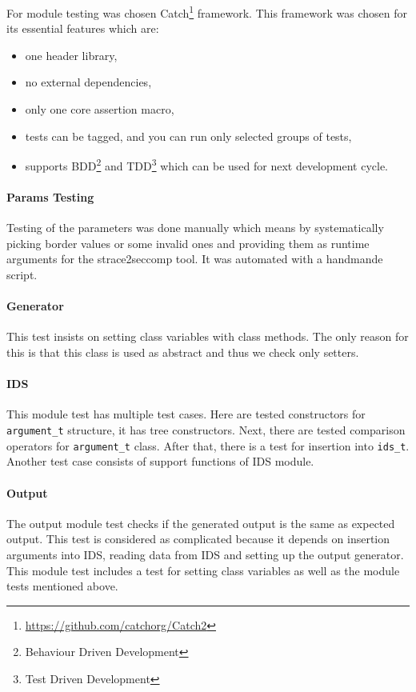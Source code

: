 For module testing was chosen Catch\footnote{\url{https://github.com/catchorg/Catch2}}
framework. This framework was chosen for its essential features which are:
\begin{itemize}
	\item one header library,
	\item no external dependencies,
	\item only one core assertion macro,
	\item tests can be tagged, and you can run only selected groups of tests,
	\item supports BDD\footnote{Behaviour Driven Development} and
	TDD\footnote{Test Driven Development} which can be used for next development
	cycle.
\end{itemize}

\paragraph{Params Testing}
Testing of the parameters was done manually which means by systematically
picking border values or some invalid ones and providing them as runtime
arguments for the strace2seccomp tool. It was automated with a handmande script.

\paragraph{Generator}
This test insists on setting class variables with class methods. The only reason
for this is that this class is used as abstract and thus we check only setters.

\paragraph{IDS}
This module test has multiple test cases. Here are tested constructors for
\texttt{argument\_t} structure, it has tree constructors. Next, there are tested
comparison operators for \texttt{argument\_t} class. After that, there is a test
for insertion into \texttt{ids\_t}. Another test case consists of support
functions of IDS module.

\paragraph{Output}
The output module test checks if the generated output is the same as expected
output. This test is considered as complicated because it depends on insertion
arguments into IDS, reading data from IDS and setting up the output generator.
This module test includes a test for setting class variables as well as the
module tests mentioned above.

